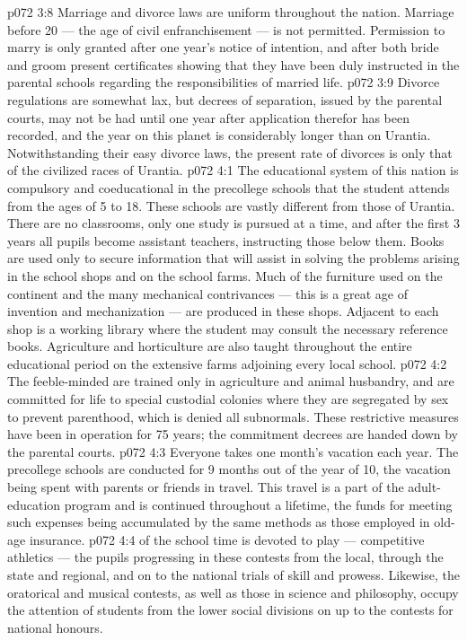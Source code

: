 \vs p072 3:8 Marriage and divorce laws are uniform throughout the nation. Marriage before 20 --- the age of civil enfranchisement --- is not permitted. Permission to marry is only granted after one year’s notice of intention, and after both bride and groom present certificates showing that they have been duly instructed in the parental schools regarding the responsibilities of married life.
\vs p072 3:9 Divorce regulations are somewhat lax, but decrees of separation, issued by the parental courts, may not be had until one year after application therefor has been recorded, and the year on this planet is considerably longer than on Urantia. Notwithstanding their easy divorce laws, the present rate of divorces is only  that of the civilized races of Urantia.
\vs p072 4:1 The educational system of this nation is compulsory and coeducational in the precollege schools that the student attends from the ages of 5 to 18. These schools are vastly different from those of Urantia. There are no classrooms, only one study is pursued at a time, and after the first 3 years all pupils become assistant teachers, instructing those below them. Books are used only to secure information that will assist in solving the problems arising in the school shops and on the school farms. Much of the furniture used on the continent and the many mechanical contrivances --- this is a great age of invention and mechanization --- are produced in these shops. Adjacent to each shop is a working library where the student may consult the necessary reference books. Agriculture and horticulture are also taught throughout the entire educational period on the extensive farms adjoining every local school.
\vs p072 4:2 \pc The feeble\hyp{}minded are trained only in agriculture and animal husbandry, and are committed for life to special custodial colonies where they are segregated by sex to prevent parenthood, which is denied all subnormals. These restrictive measures have been in operation for 75 years; the commitment decrees are handed down by the parental courts.
\vs p072 4:3 \pc Everyone takes one month’s vacation each year. The precollege schools are conducted for 9 months out of the year of 10, the vacation being spent with parents or friends in travel. This travel is a part of the adult\hyp{}education program and is continued throughout a lifetime, the funds for meeting such expenses being accumulated by the same methods as those employed in old\hyp{}age insurance.
\vs p072 4:4  of the school time is devoted to play --- competitive athletics --- the pupils progressing in these contests from the local, through the state and regional, and on to the national trials of skill and prowess. Likewise, the oratorical and musical contests, as well as those in science and philosophy, occupy the attention of students from the lower social divisions on up to the contests for national honours.

